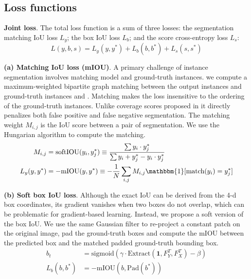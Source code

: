 \subsection{Loss functions}

\textbf{Joint loss}. The total loss function is a sum of three losses:
the segmentation matching IoU loss $L_y$; the box IoU loss $L_b$;
and the score cross-entropy loss $L_s$:
\vspace{-3pt}
\begin{equation}
L(y, b, s) = L_y(y, y^*) + L_b(b, b^*) + L_s(s, s^*)
\end{equation}
\vspace{-4pt}

\textbf{(a) Matching IoU loss (mIOU)}. A primary challenge of instance segmentation
involves matching model and ground-truth instances.  we compute a
maximum-weighted 
bipartite graph matching between the output instances and ground-truth
instances \cite{stewart15lstmdet} and \cite{romeraparedes15ris}. Matching makes
the loss insensitive to the ordering of the ground-truth instances. Unlike
coverage scores proposed in \cite{silberman14insseg} it directly penalizes both
false positive and false negative segmentation. The matching weight $M_{i, j}$
is the IoU score between a pair of segmentation. We use the Hungarian algorithm
to compute the matching.
\begin{align}
M_{i, j} &= \text{softIOU}(y_i, y^*_j) \equiv \frac{\sum y_i \cdot y^*_j}
{\sum y_i + y^*_j - y_i \cdot y^*_j} \\
L_y(y, y^*) &= -\text{mIOU}(y, y^*) \equiv -\frac{1}{N} \sum_{i, j} 
M_{i, j} \mathbbm{1}[\text{match}(y_i) = y^*_j]
\end{align}

\textbf{(b) Soft box IoU loss}. Although the exact IoU can be derived from the 4-d
box coordinates, its gradient vanishes when two boxes do not overlap, which can
be problematic for gradient-based  learning. Instead, we propose a soft version
of the box IoU. We use the same Gaussian filter to re-project a constant patch
on the original image, pad the ground-truth boxes and compute the mIOU between
the predicted box and the matched padded ground-truth bounding box.
\vspace{-3pt}
\begin{align}
b_{t} &= \text{sigmoid}(\gamma \cdot \text{Extract}(\mathbf{1}, F_Y^T, F_X^T) -
\beta)\\
L_b(b, b^*) &= -\text{mIOU}(b, \text{Pad}(b^*))
\end{align}

